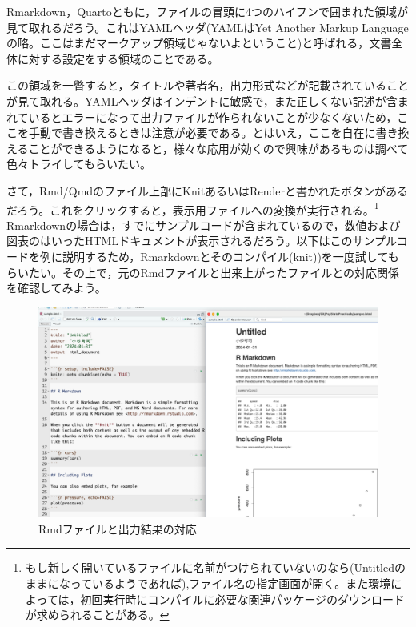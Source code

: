 \documentclass[
  a4paper,
]{ltjsbook}
\begin{document}
Rmarkdown，Quartoともに，ファイルの冒頭に4つのハイフンで囲まれた領域が見て取れるだろう。これはYAMLヘッダ(YAMLはYet
Another Markup
Languageの略。ここはまだマークアップ領域じゃないよということ)と呼ばれる，文書全体に対する設定をする領域のことである。

この領域を一瞥すると，タイトルや著者名，出力形式などが記載されていることが見て取れる。YAMLヘッダはインデントに敏感で，また正しくない記述が含まれているとエラーになって出力ファイルが作られないことが少なくないため，ここを手動で書き換えるときは注意が必要である。とはいえ，ここを自在に書き換えることができるようになると，様々な応用が効くので興味があるものは調べて色々トライしてもらいたい。

さて，Rmd/Qmdのファイル上部にKnitあるいはRenderと書かれたボタンがあるだろう。これをクリックすると，表示用ファイルへの変換が実行される。\footnote{もし新しく開いているファイルに名前がつけられていないのなら(Untitledのままになっているようであれば),ファイル名の指定画面が開く。また環境によっては，初回実行時にコンパイルに必要な関連パッケージのダウンロードが求められることがある。}
Rmarkdownの場合は，すでにサンプルコードが含まれているので，数値および図表のはいったHTMLドキュメントが表示されるだろう。以下はこのサンプルコードを例に説明するため，Rmarkdownとそのコンパイル(knit))を一度試してもらいたい。その上で，元のRmdファイルと出来上がったファイルとの対応関係を確認してみよう。

\begin{figure}[H]

{\centering \includegraphics{Figs/04_coresspRmd.png}

}

\caption{Rmdファイルと出力結果の対応}

\end{figure}%
\end{document}
